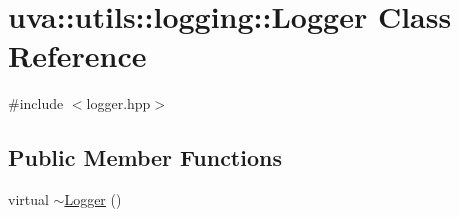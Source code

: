 \hypertarget{classuva_1_1utils_1_1logging_1_1_logger}{}\section{uva\+:\+:utils\+:\+:logging\+:\+:Logger Class Reference}
\label{classuva_1_1utils_1_1logging_1_1_logger}


{\ttfamily \#include $<$logger.\+hpp$>$}

\subsection*{Public Member Functions}
\begin{DoxyCompactItemize}
\item 
virtual \hyperlink{classuva_1_1utils_1_1logging_1_1_logger_a0ff9f0d22e6914f8634e9339bab03c56}{$\sim$\+Logger} ()
\end{DoxyCompactItemize}
